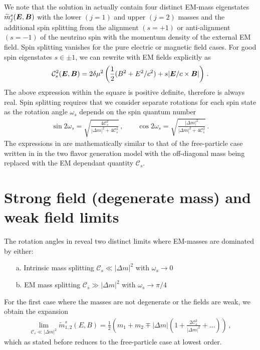 We note that the solution in  actually contain four distinct EM-mass eigenstates $\widetilde m_{j}^{s}(\boldsymbol{E},\boldsymbol{B})$ with the lower $(j=1)$ and upper $(j=2)$ masses and the additional spin splitting from the alignment $(s=+1)$ or anti-alignment $(s=-1)$ of the neutrino spin with the momentum density of the external EM field. Spin splitting vanishes for the pure electric or magnetic field cases. For good spin eigenstates $s\in\pm1$, we can rewrite  with EM fields explicitly as
\begin{align}
\label{spinsplit:1}
\mathcal{C}^{2}_{s}(\boldsymbol{E},\boldsymbol{B})=2\delta\mu^{2}\left(\frac{1}{2}(B^{2}+E^{2}/c^{2})+s|\boldsymbol{E}/c\times\boldsymbol{B}|\right)\,.
\end{align}
The above expression within the square is positive definite, therefore  is always real. Spin splitting requires that we consider separate rotations for each spin state as the rotation angle $\omega_{s}$ depends on the spin quantum number
\begin{align}
\label{zrot:3}
\sin2\omega_{s}=\sqrt{\frac{4\mathcal{C}_{s}^{2}}{|\Delta m|^{2}+4\mathcal{C}_{s}^{2}}}\,,\qquad
\cos2\omega_{s}=\sqrt{\frac{|\Delta m|^{2}}{|\Delta m|^{2}+4\mathcal{C}_{s}^{2}}}\,.
\end{align}
The expressions in  are mathematically similar to that of the free-particle case written in  in the two flavor generation model with the off-diagonal mass being replaced with the EM dependant quantity $\mathcal{C}_{s}$.

\section{Strong field (degenerate mass) and weak field limits}
\label{sec:nulimits}
The rotation angles in  reveal two distinct limits where EM-masses are dominated by either:
\begin{itemize}[nosep]
    \item[a.] Intrinsic mass splitting $\mathcal{C}_{s}\ll|\Delta m|^{2}$ with $\omega_{s}\rightarrow0$
    \item[b.] EM mass splitting $\mathcal{C}_{s}\gg|\Delta m|^{2}$ with $\omega_{s}\rightarrow\pi/4$
\end{itemize}
For the first case where the masses are not degenerate or the fields are weak, we obtain the expansion
\begin{align}
\label{series:1}
\lim_{\mathcal{C}_{s}\ll|\Delta m|^{2}}\widetilde m_{1,2}^{s}(E,B)=\frac{1}{2}\left(m_{1}+m_{2}\mp|\Delta m|\left(1+\frac{2\mathcal{C}_{s}^{2}}{|\Delta m|^{2}}+\ldots\right)\right)\,,
\end{align}
which as stated before reduces to the free-particle case at lowest order.

